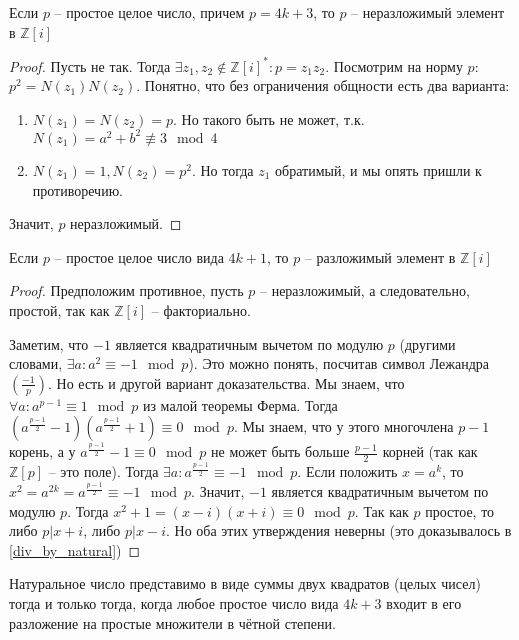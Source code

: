 \documentclass{article}
\begin{document}
\begin{statement}
    Если $p$ -- простое целое число, причем $p = 4k + 3$, то $p$ -- неразложимый элемент в $\mathbb{Z}[i]$
\end{statement}

\begin{proof}
    Пусть не так. Тогда $\exists z_1, z_2 \not \in \mathbb{Z}[i]^*: p = z_1 z_2$. Посмотрим на норму $p$: $p^2 = N(z_1)
    N(z_2)$. Понятно, что без ограничения общности есть два варианта:
    \begin{enumerate}
        \item $N(z_1) = N(z_2) = p$. Но такого быть не может, т.к. $N(z_1) = a^2 + b^2 \not \equiv 3 \mod 4$
        \item $N(z_1) = 1, N(z_2) = p^2$. Но тогда $z_1$ обратимый, и мы опять пришли к противоречию.
    \end{enumerate}
    Значит, $p$ неразложимый.
\end{proof}

\begin{statement}
    Если $p$ -- простое целое число вида $4k + 1$, то $p$ -- разложимый элемент в $\mathbb{Z}[i]$
\end{statement}

\begin{proof}
    Предположим противное, пусть $p$ -- неразложимый, а следовательно, простой, так как $\mathbb{Z}[i]$ -- факториально.
    
    Заметим, что $-1$ является квадратичным вычетом по модулю $p$ (другими словами, $\exists a: a^2 \equiv -1 \mod p$).
    Это можно понять, посчитав символ Лежандра $\left(\frac{-1}{p}\right)$. Но есть и другой вариант доказательства. Мы
    знаем, что $\forall a: a^{p - 1} \equiv 1 \mod p$ из малой теоремы Ферма. Тогда $(a^{\frac{p - 1}{2}} - 1)
    (a^{\frac{p - 1}{2}} + 1) \equiv 0 \mod p$. Мы знаем, что у этого многочлена $p - 1$ корень, а у
    $a^{\frac{p - 1}{2}} - 1 \equiv 0 \mod p$ не может быть больше $\frac{p - 1}{2}$ корней (так как $\mathbb{Z}[p]$ --
    это поле). Тогда $\exists a: a^{\frac{p - 1}{2}} \equiv -1 \mod p$. Если положить $x = a^{k}$, то $x^2 =
    a^{2k} = a^{\frac{p - 1}{2}} \equiv -1 \mod p$. Значит, $-1$ является квадратичным вычетом по модулю $p$. Тогда $x^2
    + 1 = (x - i)(x + i) \equiv 0 \mod p$. Так как $p$ простое, то либо $p | x + i$, либо $p | x - i$. Но оба этих
    утверждения неверны (это доказывалось в \ref{div_by_natural})
\end{proof}

\begin{statement}
    Натуральное число представимо в виде суммы двух квадратов (целых чисел) тогда и только тогда, когда
    любое простое число вида $4k + 3$ входит в его разложение на простые множители в чётной степени.
\end{statement}
\end{document}
